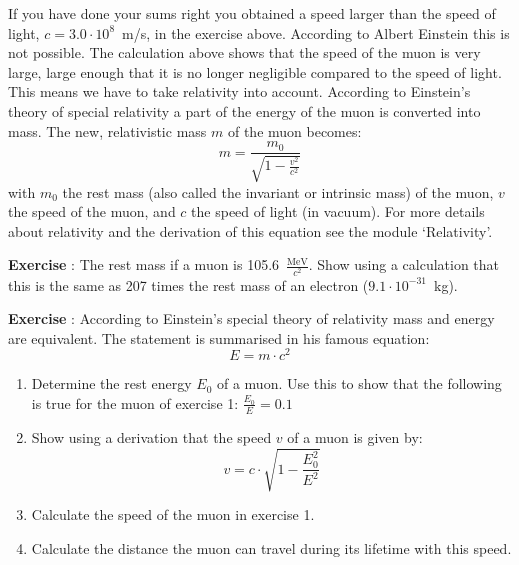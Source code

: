 If you have done your sums right you obtained a speed larger than the speed of light, $c = 3.0 \cdot 10^8$~m/s,  in the exercise above. According to Albert Einstein this is not possible. The calculation above shows that the speed of the muon is very large, large enough that it is no longer negligible compared to the speed of light. This means we have to take relativity into account. According to Einstein's theory of special relativity a part of the energy of the muon is converted into mass. The new, relativistic mass $m$ of the muon becomes:
\begin{equation}
m = \frac{m_0}{\sqrt{1-\frac{v^2}{c^2}}}
\end{equation}
with $m_0$ the rest mass (also called the invariant or intrinsic mass) of the muon, $v$ the speed of the muon, and $c$ the speed of light (in vacuum). For more details about relativity and the derivation of this equation see the module `Relativity'.

\begin{shaded}
\textbf{Exercise \theExercise {}} : The rest mass if a muon is 105.6~$\frac{\mbox{MeV}}{c^2}$. Show using a calculation that this is the same as 207 times the rest mass of an electron ($9.1 \cdot 10^{-31}$~kg).\end{shaded}

\begin{shaded}
\textbf{Exercise \theExercise {}} : According to Einstein's special theory of relativity mass and energy are equivalent. The statement is summarised in his famous equation:
\begin{equation}
E= m \cdot c^2
\end{equation}
\begin{enumerate}[-]
\item Determine the rest energy $E_0$ of a muon. Use this to show that the following is true for the muon of exercise 1: $\frac{E_0}{E}=0.1$
\item Show using a derivation that the speed $v$ of a muon is given by:
\begin{equation}
v = c \cdot \sqrt{1- \frac{E^2_0}{E^2}}
\end{equation}
\item Calculate the speed of the muon in exercise 1.
\item Calculate the distance the muon can travel during its lifetime with this speed.
\end{enumerate}\end{shaded}

